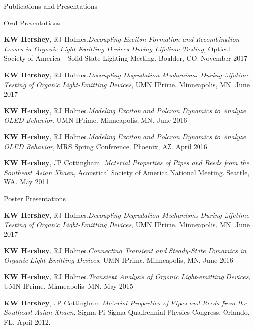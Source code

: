 \documentclass{resume} %
\begin{document}
\begin{rSection}{Publications and Presentations}
\begin{rSubsection}{Oral Presentations}{}{}{}
\item \textbf{KW Hershey}, RJ Holmes.{\em Decoupling Exciton Formation and Recombination Losses in Organic Light-Emitting Devices During Lifetime Testing}, Optical Society of America - Solid State Lighting Meeting. Boulder, CO. November 2017
\item \textbf{KW Hershey}, RJ Holmes.{\em Decoupling Degradation Mechanisms During Lifetime Testing of Organic Light-Emitting Devices}, UMN IPrime. Minneapolis, MN. June 2017 
\item \textbf{KW Hershey}, RJ Holmes.{\em Modeling Exciton and Polaron Dynamics to Analyze OLED Behavior}, UMN IPrime. Minneapolis, MN. June 2016 
\item \textbf{KW Hershey}, RJ Holmes.{\em Modeling Exciton and Polaron Dynamics to Analyze OLED Behavior}, MRS Spring Conference. Phoenix, AZ. April 2016 
\item \textbf{KW Hershey}, JP Cottingham. {\em Material Properties of Pipes and Reeds from the Southeast Asian Khaen}, Acoustical Society of America National Meeting. Seattle, WA. May 2011 
\end{rSubsection}
\begin{rSubsection}{Poster Presentations}{}{}{}
\item \textbf{KW Hershey}, RJ Holmes.{\em Decoupling Degradation Mechanisms During Lifetime Testing of Organic Light-Emitting Devices}, UMN IPrime. Minneapolis, MN. June 2017 
\item \textbf{KW Hershey}, RJ Holmes.{\em Connecting Transient and Steady-State Dynamics in Organic Light Emitting Devices}, UMN IPrime. Minneapolis, MN. June 2016 
\item \textbf{KW Hershey}, RJ Holmes.{\em Transient Analysis of Organic Light-emitting Devices}, UMN IPrime. Minneapolis, MN. May 2015 
\item \textbf{KW Hershey}, JP Cottingham.{\em Material Properties of Pipes and Reeds from the Southeast Asian Khaen}, Sigma Pi Sigma Quadrennial Physics Congress. Orlando, FL. April 2012.

\end{rSubsection}
\end{rSection}
\end{document}
